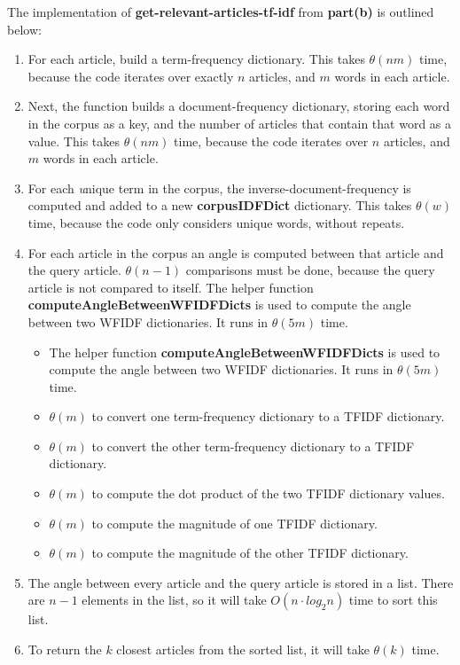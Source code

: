 \documentclass[12pt,twoside]{article}
\begin{document}
\begin{problems}
\begin{problemparts}

\newcommand{\functionb}{get-relevant-articles-tf-idf}
\newcommand{\functionc}{search}

\vspace{5mm}

The implementation of {\bf \functionb} from {\bf part(b)} is outlined below:
\begin{enumerate}
	\item For each article, build a term-frequency dictionary. This takes $\theta(nm)$ time, because the code iterates over exactly $n$ articles, and $m$ words in each article.
	\item Next, the function builds a document-frequency dictionary, storing each word in the corpus as a key, and the number of articles that contain that word as a value. This takes $\theta(nm)$ time, because the code iterates over $n$ articles, and $m$ words in each article.
	\item For each {\textit unique} term in the corpus, the inverse-document-frequency is computed and added to a new {\bf corpusIDFDict} dictionary. This takes $\theta(w)$ time, because the code only considers unique words, without repeats.
	\item For each article in the corpus an angle is computed between that article and the query article. $\theta(n-1)$ comparisons must be done, because the query article is not compared to itself. The helper function {\bf computeAngleBetweenWFIDFDicts} is used to compute the angle between two WFIDF dictionaries. It runs in $\theta(5m)$ time.
		\begin{itemize}
			\item The helper function {\bf computeAngleBetweenWFIDFDicts} is used to compute the angle between two WFIDF dictionaries. It runs in $\theta(5m)$ time.
			\item $\theta(m)$ to convert one term-frequency dictionary to a TFIDF dictionary.
			\item $\theta(m)$ to convert the other term-frequency dictionary to a TFIDF dictionary.
			\item $\theta(m)$ to compute the dot product of the two TFIDF dictionary values.
			\item $\theta(m)$ to compute the magnitude of one TFIDF dictionary.
			\item $\theta(m)$ to compute the magnitude of the other TFIDF dictionary.
		\end{itemize}
	\item The angle between every article and the query article is stored in a list. There are $n-1$ elements in the list, so it will take $O(n \cdot log_2n)$ time to sort this list.
	\item To return the $k$ closest articles from the sorted list, it will take $\theta(k)$ time.
\end{enumerate}


\end{problemparts}
\end{problems}
\end{document}
